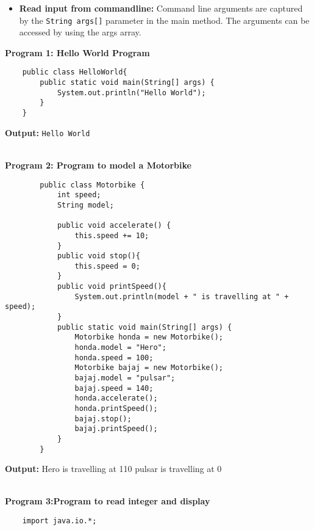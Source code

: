 \documentclass{book}
\begin{document}
{\begin{itemize}
        \begin{verbatim}
                class classRoom{
                    public int studentNum;
                    public static int roomCount=0;
                    public void addStudent(){
                        studentNum++;
                    }
                    classRoom(int num){
                        studentNum=num;
                    }
                }
        \end{verbatim}
    \item{\textbf{Read input from commandline:}}
        Command line arguments are captured by the \verb|String args[]| parameter in the main method. The arguments can be accessed by using the args array.
\end{itemize}
\newpage
\textbf{Program 1: Hello World Program}
\begin{verbatim}
    public class HelloWorld{
        public static void main(String[] args) {
            System.out.println("Hello World");
        }
    }
\end{verbatim}

\textbf{Output:}
    \verb|Hello World|
\\
\\
\par
\textbf{Program 2: Program to model a Motorbike}
    \begin{verbatim}
        public class Motorbike {
            int speed;
            String model;

            public void accelerate() {
                this.speed += 10;
            }
            public void stop(){
                this.speed = 0;
            }
            public void printSpeed(){
                System.out.println(model + " is travelling at " + speed);
            }
            public static void main(String[] args) {
                Motorbike honda = new Motorbike();
                honda.model = "Hero";
                honda.speed = 100;
                Motorbike bajaj = new Motorbike();
                bajaj.model = "pulsar";
                bajaj.speed = 140;
                honda.accelerate();
                honda.printSpeed();
                bajaj.stop();
                bajaj.printSpeed();
            }
        }
    \end{verbatim}
\par
\textbf{Output:}
Hero is travelling at 110
pulsar is travelling at 0
\\
\\
\par
\textbf{Program 3:Program to read integer and display}
\begin{verbatim}
    import java.io.*;


\end{verbatim}}
\end{document}
